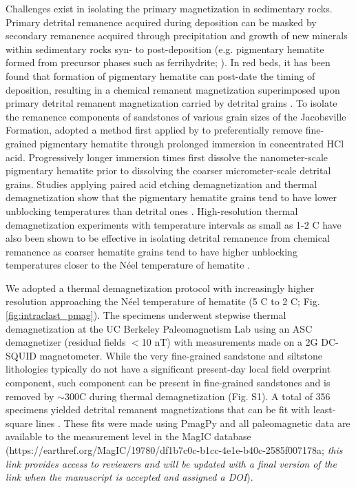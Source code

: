 \documentclass[draft]{agujournal2019}
\begin{document}
Challenges exist in isolating the primary magnetization in sedimentary rocks. Primary detrital remanence acquired during deposition can be masked by secondary remanence acquired through precipitation and growth of new minerals within sedimentary rocks syn- to post-deposition (e.g. pigmentary hematite formed from precursor phases such as ferrihydrite; ). In red beds, it has been found that formation of pigmentary hematite can post-date the timing of deposition, resulting in a chemical remanent magnetization superimposed upon primary detrital remanent magnetization carried by detrital grains \cite{Collinson1974a, Tauxe1980a}. To isolate the remanence components of sandstones of various grain sizes of the Jacobsville Formation,  adopted a method first applied by  to preferentially remove fine-grained pigmentary hematite through prolonged immersion in concentrated HCl acid. Progressively longer immersion times first dissolve the nanometer-scale pigmentary hematite prior to dissolving the coarser micrometer-scale detrital grains. Studies applying paired acid etching demagnetization and thermal demagnetization show that the pigmentary hematite grains tend to have lower unblocking temperatures than detrital ones \cite{Tauxe1980a, Bilardello2010c}. High-resolution thermal demagnetization experiments with temperature intervals as small as 1-2 \textdegree C have also been shown to be effective in isolating detrital remanence from chemical remanence as coarser hematite grains tend to have higher unblocking temperatures closer to the N\'eel temperature of hematite \cite{Jiang2015a,Swanson-Hysell2019b}. 

We adopted a thermal demagnetization protocol with increasingly higher resolution approaching the N\'eel temperature of hematite (5 \textdegree C to 2 \textdegree C; Fig. \ref{fig:intraclast_pmag}). The specimens underwent stepwise thermal demagnetization at the UC Berkeley Paleomagnetism Lab using an ASC demagnetizer (residual fields $<$10 nT) with measurements made on a 2G DC-SQUID magnetometer. While the very fine-grained sandstone and siltstone lithologies typically do not have a significant present-day local field overprint component, such component can be present in fine-grained sandstones and is removed by $\sim$300\textdegree C during thermal demagnetization (Fig. S1). A total of 356 specimens yielded detrital remanent magnetizations that can be fit with least-square lines \cite{Kirschvink1980a}. These fits were made using PmagPy \cite{Tauxe2016a} and all paleomagnetic data are available to the measurement level in the MagIC database (https://earthref.org/MagIC/19780/df1b7c0c-b1cc-4e1e-b40c-2585f007178a; \textit{this link provides access to reviewers and will be updated with a final version of the link when the manuscript is accepted and assigned a DOI}).
\end{document}
